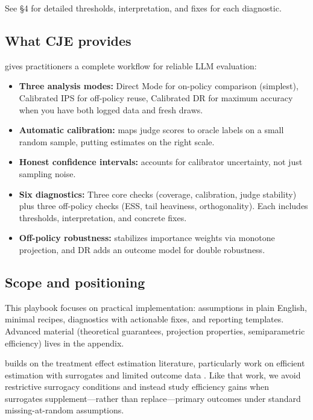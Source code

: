 See §4 for detailed thresholds, interpretation, and fixes for each diagnostic.

\subsection{What CJE provides}

\cje{} gives practitioners a complete workflow for reliable LLM evaluation:

\begin{itemize}
\item \textbf{Three analysis modes:} Direct Mode for on-policy comparison (simplest), Calibrated IPS for off-policy reuse, Calibrated DR for maximum accuracy when you have both logged data and fresh draws.

\item \textbf{Automatic calibration:} \autocal{} maps judge scores to oracle labels on a small random sample, putting estimates on the right scale.

\item \textbf{Honest confidence intervals:} \oua{} accounts for calibrator uncertainty, not just sampling noise.

\item \textbf{Six diagnostics:} Three core checks (coverage, calibration, judge stability) plus three off-policy checks (ESS, tail heaviness, orthogonality). Each includes thresholds, interpretation, and concrete fixes.

\item \textbf{Off-policy robustness:} \simcal{} stabilizes importance weights via monotone projection, and DR adds an outcome model for double robustness.
\end{itemize}

\subsection{Scope and positioning}

This playbook focuses on practical implementation: assumptions in plain English, minimal recipes, diagnostics with actionable fixes, and reporting templates. Advanced material (theoretical guarantees, projection properties, semiparametric efficiency) lives in the appendix.

\cje{} builds on the treatment effect estimation literature, particularly work on efficient estimation with surrogates and limited outcome data \cite{kallus2024role}. Like that work, we avoid restrictive surrogacy conditions and instead study efficiency gains when surrogates supplement---rather than replace---primary outcomes under standard missing-at-random assumptions.

